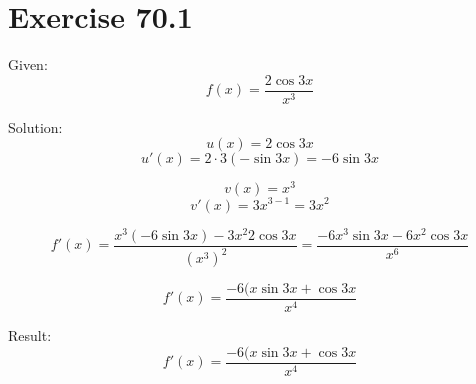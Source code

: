 \documentclass[a4paper, 10pt]{scrartcl}
\begin{document}
\section{Exercise 70.1}

Given:
\[f(x) = \frac{2\cos{3x}}{x^{3}}\]

Solution:
\[u(x) = 2\cos{3x}\]
\[u'(x) = 2\cdot3(-\sin{3x}) = -6\sin{3x}\]

\[v(x) = x^{3}\]
\[v'(x) = 3x^{3 - 1} = 3x^{2}\]

\[f'(x) = \frac{x^{3}(-6\sin{3x}) - 3x^{2}2\cos{3x}}{(x^{3})^{2}} =
         \frac{-6x^{3}\sin{3x} - 6x^{2}\cos{3x}}{x^{6}}\]

\[f'(x) = \frac{-6(x\sin{3x} + \cos{3x}}{x^{4}}\]

Result:
\[f'(x) = \frac{-6(x\sin{3x} + \cos{3x}}{x^{4}}\]
\end{document}
